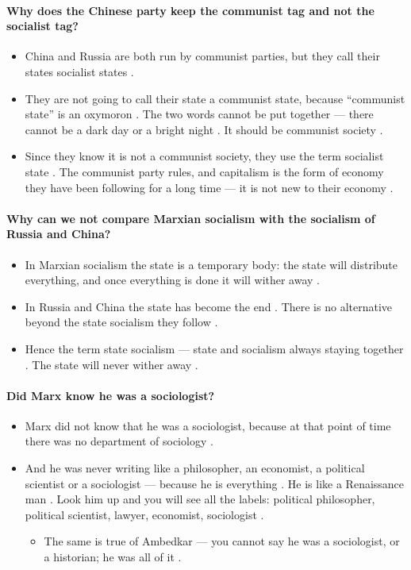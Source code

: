 \paragraph{Why does the Chinese party keep the communist tag and not the socialist tag?}
\begin{itemize}
    \item China and Russia are both run by communist parties, but they call their states socialist states .
    \item They are not going to call their state a communist state, because ``communist state'' is an oxymoron . The two words cannot be put together --- there cannot be a dark day or a bright night . It should be communist society .
    \item Since they know it is not a communist society, they use the term socialist state . The communist party rules, and capitalism is the form of economy they have been following for a long time --- it is not new to their economy .
\end{itemize}

\paragraph{Why can we not compare Marxian socialism with the socialism of Russia and China?}
\begin{itemize}
    \item In Marxian socialism the state is a temporary body: the state will distribute everything, and once everything is done it will wither away .
    \item In Russia and China the state has become the end . There is no alternative beyond the state socialism they follow .
    \item Hence the term state socialism --- state and socialism always staying together . The state will never wither away .
\end{itemize}

\paragraph{Did Marx know he was a sociologist?}
\begin{itemize}
    \item Marx did not know that he was a sociologist, because at that point of time there was no department of sociology .
    \item And he was never writing like a philosopher, an economist, a political scientist or a sociologist --- because he is everything . He is like a Renaissance man . Look him up and you will see all the labels: political philosopher, political scientist, lawyer, economist, sociologist .
    \begin{itemize}
        \item The same is true of Ambedkar --- you cannot say he was a sociologist, or a historian; he was all of it .
    \end{itemize}
\end{itemize}

